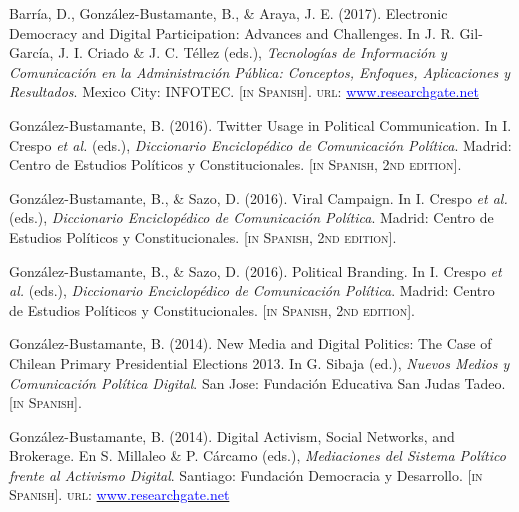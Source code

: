 \begin{publications}
\begin{benumerate}{13}
\item{\small Barr\'ia, D., Gonz\'alez-Bustamante, B., \& Araya, J. E. (2017). Electronic Democracy and Digital Participation: Advances and Challenges. In J. R. Gil-Garc\'ia, J. I. Criado \&  J. C. T\'ellez (eds.), {\itshape Tecnolog\'ias de Informaci\'on y Comunicaci\'on en la Administraci\'on P\'ublica: Conceptos, Enfoques, Aplicaciones y Resultados}. Mexico City: INFOTEC. {\footnotesize \scshape [in Spanish]}. {\scshape url}: \href{https://www.researchgate.net/publication/321980289_Democracia_electronica_y_participacion_digital_Avances_y_desafios}{\textcolor{blue}{www.researchgate.net}}}\vspace{1mm}

\item{\small Gonz\'alez-Bustamante, B. (2016). Twitter Usage in Political Communication. In I. Crespo {\itshape et al.} (eds.), {\itshape Diccionario Enciclop\'edico de Comunicaci\'on Pol\'itica}. Madrid: Centro de Estudios Políticos y Constitucionales. {\footnotesize \scshape [in Spanish, 2nd edition]}.}\vspace{1mm}

\item{\small Gonz\'alez-Bustamante, B., \& Sazo, D. (2016). Viral Campaign. In I. Crespo {\itshape et al.} (eds.), {\itshape Diccionario Enciclop\'edico de Comunicaci\'on Pol\'itica}. Madrid: Centro de Estudios Políticos y Constitucionales. {\footnotesize \scshape [in Spanish, 2nd edition]}.}\vspace{1mm}

\item{\small Gonz\'alez-Bustamante, B., \& Sazo, D. (2016). Political Branding. In I. Crespo {\itshape et al.} (eds.), {\itshape Diccionario Enciclop\'edico de Comunicaci\'on Pol\'itica}. Madrid: Centro de Estudios Políticos y Constitucionales. {\footnotesize \scshape [in Spanish, 2nd edition]}.}\vspace{1mm}

\item{\small Gonz\'alez-Bustamante, B. (2014). New Media and Digital Politics: The Case of Chilean Primary Presidential Elections 2013. In G. Sibaja (ed.), {\itshape Nuevos Medios y Comunicaci\'on Pol\'itica Digital}. San Jose: Fundación Educativa San Judas Tadeo. {\footnotesize \scshape [in Spanish]}.}\vspace{1mm}

\item{\small Gonz\'alez-Bustamante, B. (2014). Digital Activism, Social Networks, and Brokerage. En S. Millaleo \& P. C\'arcamo (eds.), {\itshape Mediaciones del Sistema Pol\'itico frente al Activismo Digital}. Santiago: Fundación Democracia y Desarrollo. {\footnotesize \scshape [in Spanish]}. {\scshape url}: \href{https://www.researchgate.net/publication/321992867_Activismo_digital_redes_sociales_e_intermediacion}{\textcolor{blue}{www.researchgate.net}}}\vspace{1mm}


\end{benumerate}
\end{publications}
